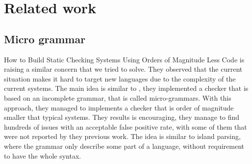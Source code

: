 \section{Related work}
\label{sec:related_work}

\subsection{Micro grammar}
\label{subsec:micro_grammar}

How to Build Static Checking Systems Using Orders of Magnitude Less Code \cite{Brown:2016:BSC:2954679.2872364} is raising a similar concern that we tried to solve. 
They observed that the current situation makes it hard to target new languages due to the complexity of the current systems. 
The main idea is similar to \slang{}, they implemented a checker that is based on an incomplete grammar, that is called micro-grammars.
With this approach, they managed to implements a checker that is order of magnitude smaller that typical systems. 
They results is encouraging, they manage to find hundreds of issues with an acceptable false positive rate, with some of them that were not reported by they previous work. 
The idea is similar to island parsing, where the grammar only describe some part of a language, without requirement to have the whole syntax.